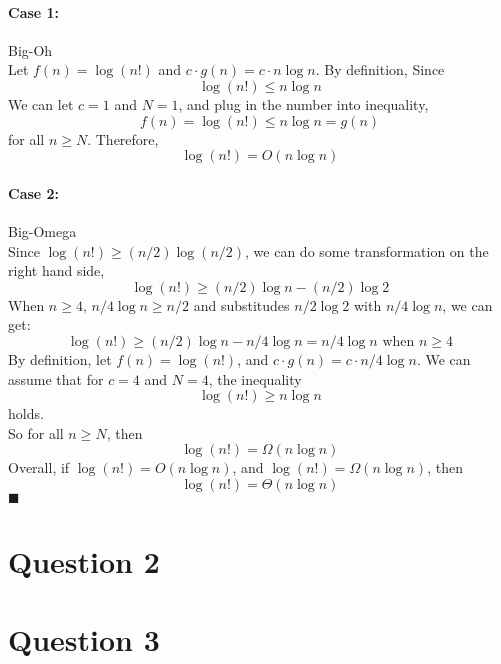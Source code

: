 \documentclass{article}
\begin{document}
    \paragraph{Case 1: } Big-Oh\\
    Let $f(n) = \log(n!)$ and $ c \cdot g(n) = c \cdot n \log n$. By definition, Since
    $$\log(n!) \leq n\log n$$
    We can let $c = 1$ and $N = 1$, and plug in the number into inequality,
    $$f(n) = \log(n!) \leq n\log n = g(n)$$
    for all $n \geq N$. Therefore,
    $$\log(n!) = O(n\log n)$$

    \paragraph{Case 2: } Big-Omega\\
    Since $\log(n!) \geq (n/2)\log(n/2)$, we can do some transformation on the right hand side,
    $$\log(n!) \geq (n/2)\log n - (n/2)\log 2$$
    When $n \geq 4$, $n/4 \log n \geq n/2$ and substitudes $n/2 \log 2$ with
    $n/4 \log n$, we can get:
    $$\log(n!) \geq (n/2)\log n - n/4\log n = n/4\log n \mbox{ when } n \geq 4$$
    By definition, let $f(n) = \log(n!)$, and $c \cdot g(n) = c \cdot n/4 \log n $.
    We can assume that for $c = 4$ and $N = 4$, the inequality 
    $$\log(n!) \geq n\log n$$
    holds.\\
    So for all $n \geq N$, then 
    $$\log(n!) = \Omega(n\log n)$$
    Overall, if $\log(n!) = O(n\log n)$, and $\log(n!) = \Omega(n\log n)$, then
    $$\log(n!) = \Theta(n \log n)$$
    $\blacksquare$








  
\section*{Question 2}

\section*{Question 3}
\end{document}
